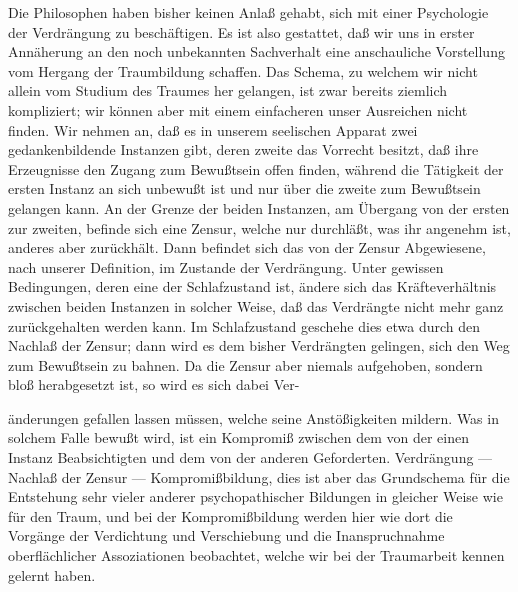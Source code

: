 \documentclass[twoside=true,titlepage=false,open=any, parskip=never, fontsize=10pt, headings=small, chapterprefix=false, appendixprefix=false]{scrbook}
\begin{document}
        \pstart
        Die Philosophen haben bisher keinen Anlaß gehabt, sich mit einer Psychologie der
               Verdrängung zu beschäftigen. Es ist also gestattet, daß wir uns in erster
               Annäherung an den noch unbekannten Sachverhalt eine anschauliche
               Vorstellung vom Hergang der Traumbildung schaffen. Das Schema, zu welchem wir
               nicht allein vom Studium des Traumes her gelangen, ist zwar bereits
               ziemlich kompliziert; wir können aber mit einem einfacheren unser Ausreichen
               nicht finden. Wir nehmen an, daß es in unserem seelischen Apparat zwei
               gedankenbildende Instanzen gibt, deren zweite das Vorrecht besitzt, daß ihre
               Erzeugnisse den Zugang zum Bewußtsein offen finden, während die Tätigkeit der
               ersten Instanz an sich unbewußt ist und nur über die zweite zum Bewußtsein
               gelangen kann. An der Grenze der beiden Instanzen, am Übergang von
               der ersten zur zweiten, befinde sich eine Zensur, welche nur durchläßt, was ihr
               angenehm ist, anderes aber zurückhält. Dann befindet sich das von der Zensur
               Abgewiesene, nach unserer Definition, im Zustande der Verdrängung. Unter
               gewissen Bedingungen, deren eine der Schlafzustand ist, ändere sich
               das Kräfteverhältnis zwischen beiden Instanzen in solcher Weise, daß
               das Verdrängte nicht mehr ganz zurückgehalten werden kann. Im Schlafzustand
               geschehe dies etwa durch den Nachlaß der Zensur; dann wird es dem bisher
               Verdrängten gelingen, sich den Weg zum Bewußtsein zu bahnen. Da die Zensur aber
               niemals aufgehoben, sondern bloß herabgesetzt ist, so wird es sich
               dabei Ver-
        \pend
    
         
            
            
            
        \pstart
        änderungen gefallen lassen müssen, welche seine Anstößigkeiten
               mildern. Was in solchem Falle bewußt wird, ist ein Kompromiß zwischen dem von
               der einen Instanz Beabsichtigten und dem von der anderen Geforderten. Verdrängung — Nachlaß der Zensur — Kompromißbildung,
               dies ist aber das Grundschema für die Entstehung sehr vieler anderer
               psychopathischer Bildungen in gleicher Weise wie für den Traum, und bei der
               Kompromißbildung werden hier wie dort die Vorgänge der Verdichtung
               und Verschiebung und die Inanspruchnahme oberflächlicher
               Assoziationen beobachtet, welche wir bei der Traumarbeit kennen gelernt
               haben.
        \pend
    
\end{document}
